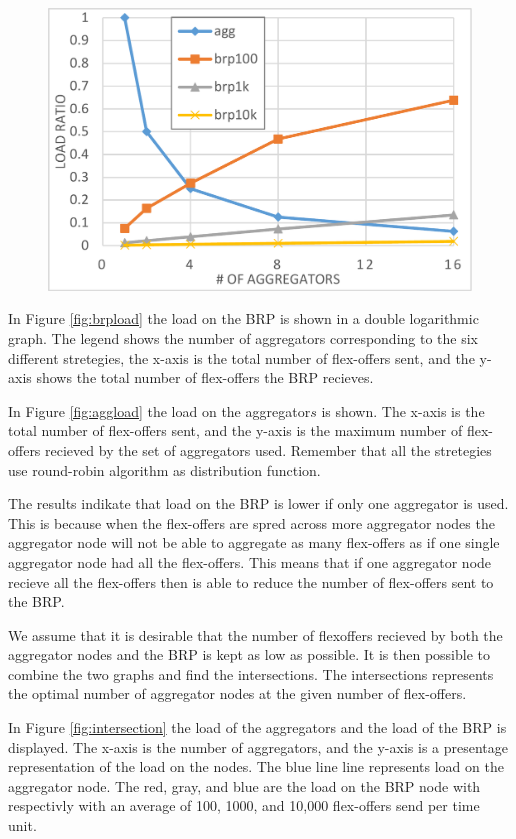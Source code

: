 \documentclass{ifacconf}
\begin{document}
\begin{figure}%
\centering
\includegraphics[width=0.75\columnwidth]{images/resultD.pdf}
\caption{}%
\label{}%
\end{figure}



In Figure \ref{fig:brpload} the load on the BRP is shown in a double logarithmic graph. 
The legend shows the number of aggregators corresponding to the six different stretegies, 
the x-axis is the total number of flex-offers sent, 
and the y-axis shows the total number of flex-offers the BRP recieves.

In Figure \ref{fig:aggload} the load on the aggregator\(s\) is shown. 
The x-axis is the total number of flex-offers sent,
and the y-axis is the maximum number of flex-offers recieved by the set of aggregators used. 
Remember that all the stretegies use round-robin algorithm as distribution function. 

The results indikate that load on the BRP is lower if only one aggregator is used. 
This is because when the flex-offers are spred across more aggregator nodes the aggregator node will not be able to aggregate as many flex-offers as if one single aggregator node had all the flex-offers. 
This means that if one aggregator node recieve all the flex-offers then is able to reduce the number of flex-offers sent to the BRP.

We assume that it is desirable that the number of flexoffers recieved by both the aggregator nodes and the BRP is kept as low as possible.
It is then possible to combine the two graphs and find the intersections.
The intersections represents the optimal number of aggregator nodes at the given number of flex-offers. 

In Figure \ref{fig:intersection} the load of the aggregators and the load of the BRP is displayed.
The x-axis is the number of aggregators, and the y-axis is a presentage representation of the load on the nodes.
The blue line line represents load on the aggregator node.
The red, gray, and blue are the load on the BRP node with respectivly with an average of 100, 1000, and 10,000 flex-offers send per time unit.
\end{document}
